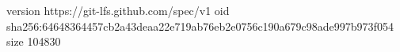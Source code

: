 version https://git-lfs.github.com/spec/v1
oid sha256:64648364457cb2a43deaa22e719ab76eb2e0756c190a679c98ade997b973f054
size 104830
